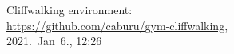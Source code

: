 \begin{thebibliography}{9}


Cliffwalking environment:\\
\url{https://github.com/caburu/gym-cliffwalking},\\
2021.~Jan~6., 12:26

\end{thebibliography}
